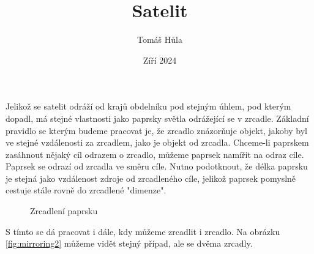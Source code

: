 \documentclass[11pt, a4paper]{article}
\title{Satelit}
\author{Tomáš Hůla}
\date{Zíří 2024}
\begin{document}
    \maketitle

    Jelikož se satelit odráží od krajů obdelníku pod stejným úhlem, pod kterým dopadl, má stejné vlastnosti jako paprsky světla odrážející se v zrcadle.
    Základní pravidlo se kterým budeme pracovat je, že zrcadlo znázorňuje objekt, jakoby byl ve stejné vzdálenosti za zrcadlem, jako je objekt od zrcadla.
    Chceme-li paprskem zasáhnout nějaký cíl odrazem o zrcadlo, můžeme paprsek namířit na odraz cíle.
    Paprsek se odrazí od zrcadla ve směru cíle.
    Nutno podotknout, že délka paprsku je stejná jako vzdálenost zdroje od zrcadleného cíle, jelikož paprsek pomyslně cestuje stále rovně do zrcadlené "dimenze".

    \begin{figure}[h]
        \centering
        \caption{Zrcadlení paprsku}
        \label{fig:mirroring1}
    \end{figure}

    S tímto se dá pracovat i dále, kdy můžeme zrcadlit i zrcadlo.
    Na obrázku \ref{fig:mirroring2} můžeme vidět stejný případ, ale se dvěma zrcadly.
\end{document}
